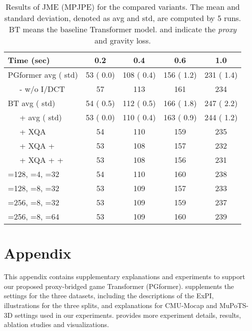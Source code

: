 \documentclass[10pt,twocolumn,letterpaper]{article}
\begin{document}
\begin{table}[t]
    \setlength\tabcolsep{2.8pt}
\caption{Results of JME (MPJPE) for the compared variants. 
    The mean and standard deviation, denoted as avg and std, are computed by 5 runs. 
    BT means the baseline Transformer model. 
     and  indicate the \textit{proxy} and gravity loss. }
    \vskip -0.2in
    \label{tab:ablation}
    \begin{center}
    \footnotesize
\begin{tabular}{l|cccc}
        \hline
        Time (sec) & 0.2 & 0.4 & 0.6 & 1.0 \\
        \hline
        PGformer avg ( std) & 53 ( 0.0) & 108 ( 0.4) & 156 ( 1.2) & 231 ( 1.4) \\
        ~~~- w/o I/DCT & 57 & 113 & 161 & 234 \\
        \hline
        BT avg ( std) & 54 ( 0.5) & 112 ( 0.5) & 166 ( 1.8) & 247 ( 2.2) \\
        ~~~+  avg ( std) & 53 ( 0.0) & 110 ( 0.4) & 163 ( 0.9) & 244 ( 1.2) \\
        ~~~+ XQA & 54 & 110 & 159 & 235 \\
        ~~~+ XQA +  & 53 & 108 & 157 & 232 \\
        ~~~+ XQA +  +  & 53 & 108 & 156 & 231 \\ 
        \hline
        =128, =4, =32 & 54 & 110 & 160 & 238 \\
        =128, =8, =32 & 53 & 109 & 157 & 233 \\
        =256, =8, =32 & 53 & 109 & 159 & 237 \\
        =256, =8, =64 & 53 & 109 & 160 & 239 \\
        \hline
    \end{tabular}
    \end{center}
    \vskip -0.3in
\end{table}
\clearpage
{\small


}



\clearpage
\appendix
\section*{Appendix}
This appendix contains supplementary explanations and experiments to support our proposed proxy-bridged game Transformer (PGformer).
 supplements the settings for the three datasets, including the descriptions of the ExPI, illustrations for the three splits, and explanations for CMU-Mocap and MuPoTS-3D settings used in our experiments. 
 provides more experiment details, results, ablation studies and visualizations. 
\end{document}
